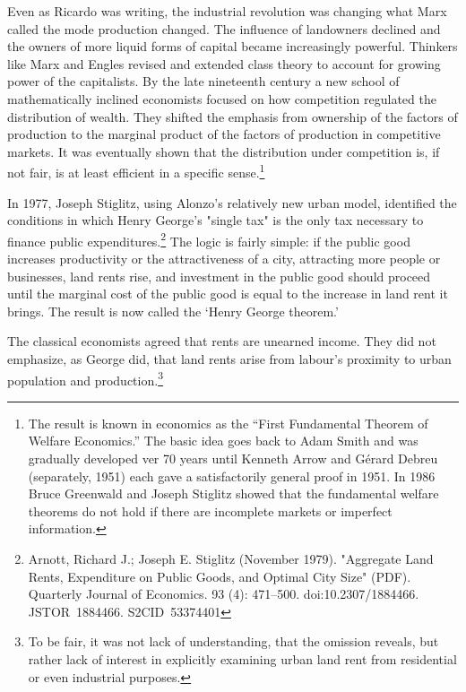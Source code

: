   
Even as Ricardo was writing, the industrial revolution was changing what Marx called the mode production changed. The influence of landowners declined and the owners of more liquid forms of capital became increasingly powerful. Thinkers like Marx and Engles revised and extended  class theory to account for growing power of the capitalists.  By the late nineteenth  century a new school of mathematically inclined economists focused on how competition regulated the distribution of wealth. They shifted the emphasis from ownership of the factors of production to the marginal product of the factors of production in competitive markets. It was eventually shown that the distribution under competition is, if not fair,  is at least efficient in a specific sense.\footnote{The result is known  in economics as the ``First Fundamental Theorem of Welfare Economics.'' The basic idea goes back to Adam Smith and was gradually developed  ver 70 years until Kenneth Arrow and Gérard Debreu (separately, 1951) each gave  a satisfactorily general proof in 1951. In 1986 %
Bruce Greenwald and Joseph Stiglitz showed that the fundamental welfare theorems do not hold if there are incomplete markets or imperfect information.}

  
  In 1977, Joseph Stiglitz, using Alonzo's relatively new urban model, identified the conditions in which Henry George's "single tax" is  the only tax necessary to finance public expenditures.\footnote{Arnott, Richard J.; Joseph E. Stiglitz (November 1979). "Aggregate Land Rents, Expenditure on Public Goods, and Optimal City Size" (PDF). Quarterly Journal of Economics. 93 (4): 471–500. doi:10.2307/1884466. JSTOR 1884466. S2CID 53374401 }   The logic is fairly simple: if the public good increases productivity or the attractiveness of a city, attracting more people or businesses, land rents rise, and investment in the public good should proceed until the marginal cost of the public good is equal to the increase in land rent it brings. The result is now called the `Henry George theorem.'



The classical economists agreed that rents are unearned income. They did not emphasize, as George did, that land rents arise from labour's proximity to urban population and production.\footnote{To be fair, it was not lack of understanding, that the omission reveals, but rather lack of interest in explicitly examining urban land rent from residential or even industrial purposes.}%


